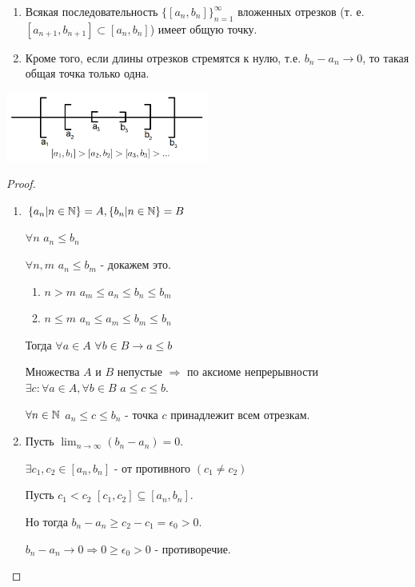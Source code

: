 	\begin{theorem}
		\begin{enumerate}
			\item Всякая последовательность $\{[a_n, b_n]\}^{\infty}_{n = 1}$ вложенных отрезков (т. е. $[a_{n + 1}, b_{n + 1}] \subset [a_n, b_n]$) имеет общую точку.
			\item Кроме того, если длины отрезков стремятся к нулю, т.е. $b_n - a_n \to 0$, то такая общая точка только одна.
		\end{enumerate}
		
		\begin{center}
			\includegraphics[width=0.5\textwidth]{img/lecture5/nested_segments}
		\end{center}
	\end{theorem}
	
	\begin{proof}
		\begin{enumerate}
			\item $\{a_n | n \in \mathbb N\} = A, \{b_n | n \in \mathbb N\} = B$
			
			$\forall n$ $a_n \leqslant b_n$
			
			$\forall n, m$ $a_n \leqslant b_m$ - докажем это.
			
			\begin{enumerate}
				\item $n > m$ $a_m \leqslant a_n \leqslant b_n \leqslant b_m$
				\item $n \leqslant m$ $a_n \leqslant a_m \leqslant b_m \leqslant b_n$
			\end{enumerate}
			Тогда $\forall a \in A$ $\forall b \in B \rightarrow a \leqslant b$
			
			Множества $A$ и $B$ непустые $\Rightarrow$ по аксиоме непрерывности $\exists c: \forall a \in A, \forall b \in B$ $a \leqslant c \leqslant b.$
			
			$\forall n \in \mathbb N$ $a_n \leqslant c \leqslant b_n$ - точка $c$ принадлежит всем отрезкам.
			
			\item Пусть $\lim_{n \to \infty} (b_n - a_n) = 0.$
			
			$\exists c_1, c_2 \in [a_n, b_n]$ - от противного $(c_1 \neq c_2)$
			
			Пусть $c_1 < c_2$ $[c_1, c_2] \subseteq [a_n, b_n].$
			
			Но тогда $b_n - a_n \geqslant c_2 - c_1 = \epsilon_0 > 0.$
			
			$b_n - a_n \to 0 \Rightarrow 0 \geqslant \epsilon_0 > 0$ - противоречие.
		\end{enumerate}
	\end{proof}
	
